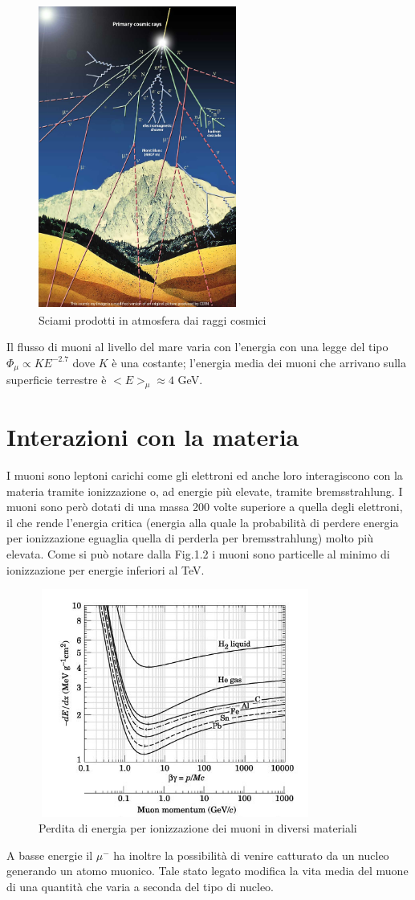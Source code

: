 \documentclass{standalone}
\begin{document}
\begin{figure}[H]
	\centering
	\includegraphics[width=6.5cm, height=10cm]{images/cosmic-rays.jpg}
	\caption{Sciami prodotti in atmosfera dai raggi cosmici}
\end{figure}


Il flusso di muoni al livello del mare varia con l'energia con una legge del tipo $\Phi_\mu \propto KE^{-2.7}$ dove $K$ è una costante; l'energia media dei muoni che arrivano sulla superficie terrestre è $<E>_\mu \approx 4$ GeV.
\clearpage
\section{Interazioni con la materia}
I muoni sono leptoni carichi come gli elettroni ed anche loro interagiscono con la materia tramite ionizzazione o, ad energie più elevate, tramite bremsstrahlung.
I muoni sono però dotati di una massa 200 volte superiore a quella degli elettroni, il che rende l'energia critica (energia alla quale la probabilità di perdere energia per ionizzazione eguaglia quella di perderla per bremsstrahlung) molto più elevata.
Come si può notare dalla Fig.1.2 i muoni sono particelle al minimo di ionizzazione per energie inferiori al TeV.
\begin{figure}[H]
	\centering
	\includegraphics[width=9cm, height=7.5cm]{images/Energyloss.jpg}
	\caption{Perdita di energia per ionizzazione dei muoni in diversi materiali}
\end{figure}
A basse energie il ${\mu}^-$ ha inoltre la possibilità di venire catturato da un nucleo generando un atomo muonico.
Tale stato legato modifica la vita media del muone di una quantità che varia a seconda del tipo di nucleo.
\end{document}
